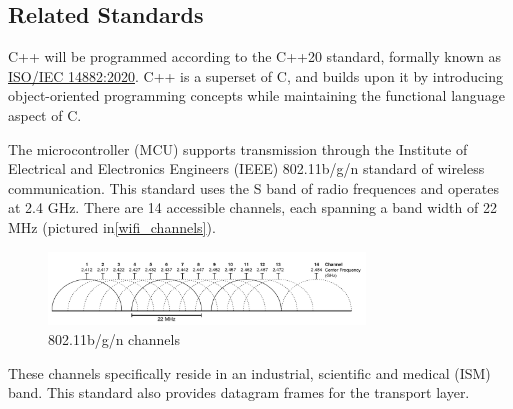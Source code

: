 \subsection{Related Standards}
\begin{flushleft}
    C++ will be programmed according to the C++20 standard, formally known as
    \href{https://www.iso.org/standard/79358.html}{ISO/IEC 14882:2020}. C++ is
    a superset of C, and builds upon it by introducing object-oriented
    programming concepts while maintaining the functional language aspect of C.
\end{flushleft}
\begin{flushleft}
    The microcontroller (MCU) supports transmission through the Institute of
    Electrical and Electronics Engineers (IEEE) 802.11b/g/n standard of wireless
    communication. This standard uses the S band of radio frequences and
    operates at 2.4 GHz. There are 14 accessible channels, each spanning a band
    width of 22 MHz (pictured in\autoref{wifi_channels}).
    \begin{figure}[H]
        \caption{802.11b/g/n channels}
        \label{wifi_channels}
        \centering
        \includegraphics[width=0.75\textwidth]{images/wifi_channels.png}
    \end{figure}
    These channels specifically reside in an industrial, scientific and medical
    (ISM) band. This standard also provides datagram frames for the transport
    layer.
\end{flushleft}
